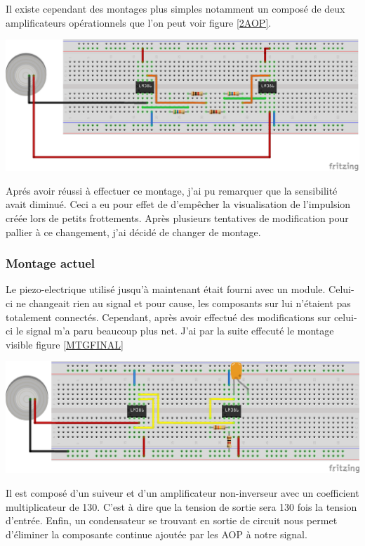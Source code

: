 \documentclass[11pt,french,a4paper]{article}
\begin{document}
Il existe cependant des montages plus simples notamment un composé de deux amplificateurs opérationnels que l'on peut voir figure \ref{2AOP}.
\\

\begin{center}	
\includegraphics[scale=0.80]{../img/instrumentation2aop_bb.png}
\label{2AOP}
\end{center}

Aprés avoir réussi à effectuer ce montage, j’ai pu remarquer que la sensibilité avait diminué. Ceci a eu pour effet de d’empêcher la visualisation de l’impulsion créée lors de petits frottements. Après plusieurs tentatives de modification pour pallier à ce changement, j’ai décidé de changer de montage.

\subsubsection{Montage actuel}
Le piezo-electrique utilisé jusqu’à maintenant était fourni avec un module. Celui-ci ne changeait rien au signal et pour cause, les composants sur lui n’étaient pas totalement connectés. Cependant, après avoir effectué des modifications sur celui-ci le signal m'a paru beaucoup plus net.
J’ai par la suite effecuté le montage visible figure \ref{MTGFINAL}
\\
\begin{center}	
\includegraphics[scale=0.85]{../img/mtgfinal.png}
\label{MTGFINAL}
\end{center}
Il est composé d’un suiveur et d’un amplificateur non-inverseur avec un coefficient multiplicateur de 130. C'est à dire que la tension de sortie sera 130 fois la tension d'entrée. Enfin, un condensateur se trouvant en sortie de circuit nous permet d’éliminer la composante continue ajoutée par les AOP à notre signal.
\end{document}
